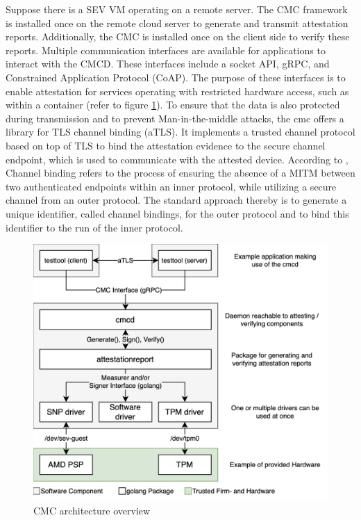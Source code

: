 Suppose there is a SEV VM operating on a remote server. The CMC framework is installed once on the remote cloud server to generate and transmit attestation reports. Additionally, the CMC is installed once on the client side to verify these reports. Multiple communication interfaces are available for applications to interact with the CMCD. These interfaces include a socket API, gRPC, and Constrained Application Protocol (CoAP). The purpose of these interfaces is to enable attestation for services operating with restricted hardware access, such as within a container (refer to figure \ref{cmc-arch}).
To ensure that the data is also protected during transmission and to prevent Man-in-the-middle attacks, the cmc offers a library for TLS channel binding (aTLS). It implements a trusted channel protocol based on top of TLS to bind the attestation evidence to the secure channel endpoint, which is used to communicate with the attested device. \cite{CMC_paper}
According to \cite{trusted_socket_layers}, Channel binding refers to the process of ensuring the absence of a MITM between two authenticated endpoints within an inner protocol, while utilizing a secure channel from an outer protocol. The standard approach thereby is to generate a unique identifier, called channel bindings, for the outer protocol and to bind this identifier to the run of the inner protocol.  

\begin{figure}
	\begin{center} 
		\includegraphics[width=0.6\linewidth]{figures/cmc-arch.png}
	\end{center}
	\caption{CMC architecture overview \cite{CMC_architecture}} 
	\label{cmc-arch}
\end{figure}
